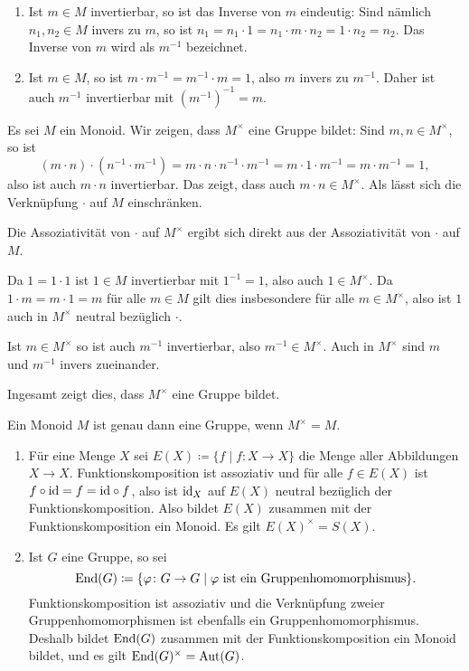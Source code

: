 \begin{bem}
 \begin{enumerate}[leftmargin=*]
  \item
   Ist $m \in M$ invertierbar, so ist das Inverse von $m$ eindeutig: Sind nämlich $n_1, n_2 \in M$ invers zu $m$, so ist $n_1 = n_1 \cdot 1 = n_1 \cdot m \cdot n_2 = 1 \cdot n_2 = n_2$. Das Inverse von $m$ wird als $m^{-1}$ bezeichnet.
  \item
   Ist $m \in M$, so ist $m \cdot m^{-1} = m^{-1} \cdot m = 1$, also $m$ invers zu $m^{-1}$. Daher ist auch $m^{-1}$ invertierbar mit $(m^{-1})^{-1} = m$.
 \end{enumerate}
\end{bem}

Es sei $M$ ein Monoid. Wir zeigen, dass $M^\times$ eine Gruppe bildet: Sind $m, n \in M^\times$, so ist
\[
 (m \cdot n) \cdot (n^{-1} \cdot m^{-1})
 = m \cdot n \cdot n^{-1} \cdot m^{-1}
 = m \cdot 1 \cdot m^{-1}
 = m \cdot m^{-1}
 = 1,
\]
also ist auch $m \cdot n$ invertierbar. Das zeigt, dass auch $m \cdot n \in M^\times$. Als lässt sich die Verknüpfung $\cdot$ auf $M$ einschränken.

Die Assoziativität von $\cdot$ auf $M^\times$ ergibt sich direkt aus der Assoziativität von $\cdot$ auf $M$.

Da $1 = 1 \cdot 1$ ist $1 \in M$ invertierbar mit $1^{-1} = 1$, also auch $1 \in M^\times$. Da $1 \cdot m = m \cdot 1 = m$ für alle $m \in M$ gilt dies insbesondere für alle $m \in M^\times$, also ist $1$ auch in $M^\times$ neutral bezüglich $\cdot$.

Ist $m \in M^\times$ so ist auch $m^{-1}$ invertierbar, also $m^{-1} \in M^\times$. Auch in $M^\times$ sind $m$ und $m^{-1}$ invers zueinander.

Ingesamt zeigt dies, dass $M^\times$ eine Gruppe bildet.

\begin{bem}
 Ein Monoid $M$ ist genau dann eine Gruppe, wenn $M^\times = M$.
\end{bem}

\begin{bsp}
 \begin{enumerate}[leftmargin=*]
  \item
   Für eine Menge $X$ sei $E(X) \coloneqq \{f \mid f \colon X \to X\}$ die Menge aller Abbildungen $X \to X$. Funktionskomposition ist assoziativ und für alle $f \in E(X)$ ist $f \circ \mathrm{id} = f = \mathrm{id} \circ f$, also ist $\mathrm{id}_X$ auf $E(X)$ neutral bezüglich der Funktionskomposition. Also bildet $E(X)$ zusammen mit der Funktionskomposition ein Monoid. Es gilt $E(X)^\times = S(X)$.
  \item
   Ist $G$ eine Gruppe, so sei
   \[
    \mathrm{End}(G) \coloneqq \{ \varphi \colon G \to G \mid \text{$\varphi$ ist ein Gruppenhomomorphismus} \}.
   \]
   Funktionskomposition ist assoziativ und die Verknüpfung zweier Gruppenhomomorphismen ist ebenfalls ein Gruppenhomomorphismus. Deshalb bildet $\mathrm{End}(G)$ zusammen mit der Funktionskomposition ein Monoid bildet, und es gilt $\mathrm{End}(G)^\times = \mathrm{Aut}(G)$.
 \end{enumerate}
\end{bsp}






